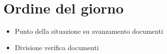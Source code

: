 \section{Ordine del giorno}
\begin{itemize}
    \item Punto della situazione su avanzamento documenti
    \item Divisione verifica documenti
\end{itemize}